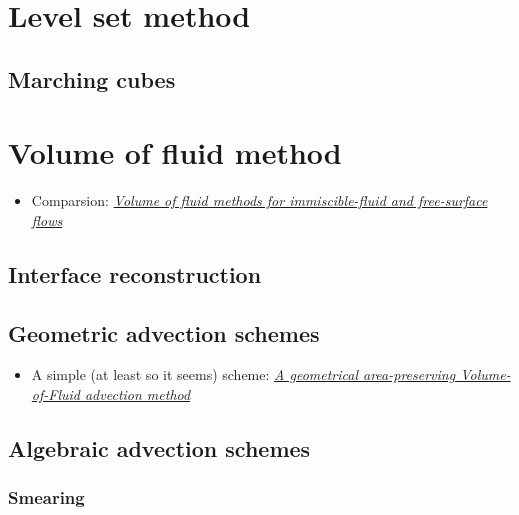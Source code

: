 \documentclass[]{report}
\begin{document}
\section{Level set method}

\subsection{Marching cubes}

\section{Volume of fluid method}

\begin{itemize}
    \item Comparsion: \textit{\href{http://capfluidicslit.mme.pdx.edu/reference/Numerics/Gopala_ChemEngJ2008_VOFMethodsFreeSurfaceFlow.pdf}{Volume of fluid methods for immiscible-fluid and free-surface flows}}
\end{itemize}


\subsection{Interface reconstruction}

\subsection{Geometric advection schemes}

\begin{itemize}
    \item A simple (at least so it seems) scheme: \textit{\href{http://www.lmm.jussieu.fr/~zaleski/nota02.pdf}{A geometrical area-preserving Volume-of-Fluid advection method}}
\end{itemize}

\subsection{Algebraic advection schemes}

\subsubsection{Smearing}
\end{document}
